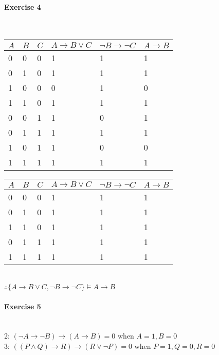 \documentclass{article}
\begin{document}
	\paragraph{Exercise 4} ~\\
	\begin{table}[h!]
		\begin{tabular}{| l | l | l | l | l | l |}
			\hline
			$A$ & $B$ & $C$ & $A \rightarrow B \lor C$ & $\neg B \rightarrow \neg C$ & $A \rightarrow B$\\ \hline
			0 & 0 & 0 & 1 & 1 & 1\\
			0 & 1 & 0 & 1 & 1 & 1\\
			1 & 0 & 0 & 0 & 1 & 0\\
			1 & 1 & 0 & 1 & 1 & 1\\
			0 & 0 & 1 & 1 & 0 & 1\\
			0 & 1 & 1 & 1 & 1 & 1\\
			1 & 0 & 1 & 1 & 0 & 0\\
			1 & 1 & 1 & 1 & 1 & 1\\
			\hline
		\end{tabular}
	\end{table}
	\begin{table}[h!]
		\begin{tabular}{| l | l | l | l | l | l |}
			\hline
			$A$ & $B$ & $C$ & $A \rightarrow B \lor C$ & $\neg B \rightarrow \neg C$ & $A \rightarrow B$\\ \hline
			0 & 0 & 0 & 1 & 1 & 1\\
			0 & 1 & 0 & 1 & 1 & 1\\
			1 & 1 & 0 & 1 & 1 & 1\\
			0 & 1 & 1 & 1 & 1 & 1\\
			1 & 1 & 1 & 1 & 1 & 1\\
			\hline
		\end{tabular}
	\end{table} \\
	$\therefore \{A\rightarrow B \lor C, \neg B\rightarrow \neg C\} \vDash A\rightarrow B$
	\paragraph{Exercise 5} ~\\
	2: $(\neg A \rightarrow \neg B)\rightarrow (A \rightarrow B) = 0$ when $A = 1, B = 0$ \\
	3: $((P \land Q) \rightarrow R) \rightarrow (R \lor \neg P) = 0$ when $P=1, Q=0, R=0$
\end{document}
